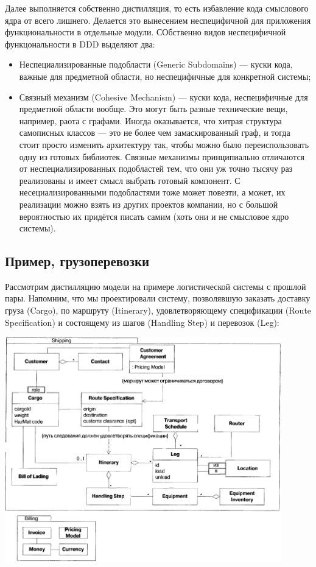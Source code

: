 \documentclass{../../text-style}
\begin{document}
Далее выполняется собственно дистилляция, то есть избавление кода смыслового ядра от всего лишнего. Делается это вынесением неспецифичной для приложения функциональности в отдельные модули. СОбственно видов неспецифичной функцональности в DDD выделяют два:

\begin{itemize}
    \item Неспециализированные подобласти (Generic Subdomains) --- куски кода, важные для предметной области, но неспецифичные для конкретной системы;
    \item Связный механизм (Cohesive Mechanism) --- куски кода, неспецифичные для предметной области вообще. Это могут быть разные технические вещи, например, раота с графами. Иногда оказывается, что хитрая структура самописных классов --- это не более чем замаскированный граф, и тогда стоит просто изменить архитектуру так, чтобы можно было переиспользовать одну из готовых библиотек. Связные механизмы принципиально отличаются от неспециализированных подобластей тем, что они уж точно тысячу раз реализованы и имеет смысл выбрать готовый компонент. С несециализированными подобластями тоже может повезти, а может, их реализации можно взять из других проектов компании, но с большой вероятностью их придётся писать самим (хоть они и не смысловое ядро системы).
\end{itemize}

\subsection{Пример, грузоперевозки}

Рассмотрим дистилляцию модели на примере логистической системы с прошлой пары. Напомним, что мы проектировали систему, позволявшую заказать доставку груза (Cargo), по маршруту (Itinerary), удовлетворяющему спецификации (Route Specification) и состоящему из шагов (Handling Step) и перевозок (Leg):

\begin{center}
    \includegraphics[width=0.9\textwidth]{shippingRaw.png}
\end{center}
\end{document}
